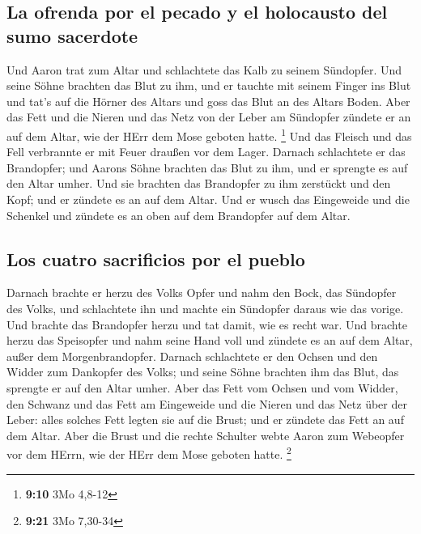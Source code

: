 \hypertarget{la-ofrenda-por-el-pecado-y-el-holocausto-del-sumo-sacerdote}{%
\subsection{La ofrenda por el pecado y el holocausto del sumo
sacerdote}\label{la-ofrenda-por-el-pecado-y-el-holocausto-del-sumo-sacerdote}}

 Und Aaron trat zum Altar und schlachtete das Kalb zu
seinem Sündopfer.  Und seine Söhne brachten das Blut zu
ihm, und er tauchte mit seinem Finger ins Blut und tat's auf die Hörner
des Altars und goss das Blut an des Altars Boden.  Aber
das Fett und die Nieren und das Netz von der Leber am Sündopfer zündete
er an auf dem Altar, wie der HErr dem Mose geboten hatte. \footnote{\textbf{9:10}
  3Mo 4,8-12}  Und das Fleisch und das Fell verbrannte er
mit Feuer draußen vor dem Lager.  Darnach schlachtete er
das Brandopfer; und Aarons Söhne brachten das Blut zu ihm, und er
sprengte es auf den Altar umher.  Und sie brachten das
Brandopfer zu ihm zerstückt und den Kopf; und er zündete es an auf dem
Altar.  Und er wusch das Eingeweide und die Schenkel und
zündete es an oben auf dem Brandopfer auf dem Altar.

\hypertarget{los-cuatro-sacrificios-por-el-pueblo}{%
\subsection{Los cuatro sacrificios por el
pueblo}\label{los-cuatro-sacrificios-por-el-pueblo}}

 Darnach brachte er herzu des Volks Opfer und nahm den
Bock, das Sündopfer des Volks, und schlachtete ihn und machte ein
Sündopfer daraus wie das vorige.  Und brachte das
Brandopfer herzu und tat damit, wie es recht war.  Und
brachte herzu das Speisopfer und nahm seine Hand voll und zündete es an
auf dem Altar, außer dem Morgenbrandopfer.  Darnach
schlachtete er den Ochsen und den Widder zum Dankopfer des Volks; und
seine Söhne brachten ihm das Blut, das sprengte er auf den Altar umher.
 Aber das Fett vom Ochsen und vom Widder, den Schwanz und
das Fett am Eingeweide und die Nieren und das Netz über der Leber:
 alles solches Fett legten sie auf die Brust; und er
zündete das Fett an auf dem Altar.  Aber die Brust und
die rechte Schulter webte Aaron zum Webeopfer vor dem HErrn, wie der
HErr dem Mose geboten hatte. \footnote{\textbf{9:21} 3Mo 7,30-34}

